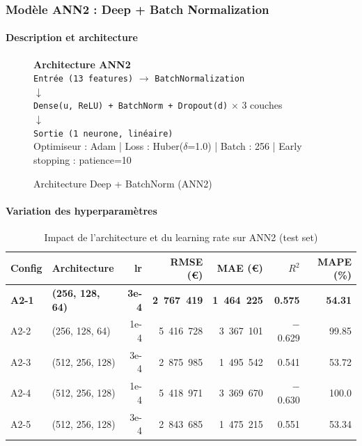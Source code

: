 \documentclass[12pt,a4paper]{article}
\begin{document}
\subsubsection{Modèle ANN2 : Deep + Batch Normalization}

\paragraph{Description et architecture}

\begin{figure}[H]
\centering
\begin{tcolorbox}[colback=lightgray,colframe=maincolor,width=0.85\textwidth,arc=2mm,boxrule=0.8pt]
\centering
\textbf{Architecture ANN2}\\[0.3cm]
\texttt{Entrée (13 features)} $\rightarrow$ \texttt{BatchNormalization}\\
$\downarrow$\\
\texttt{Dense(u, ReLU) + BatchNorm + Dropout(d)} $\times$ 3 couches\\
$\downarrow$\\
\texttt{Sortie (1 neurone, linéaire)}\\[0.2cm]
\small Optimiseur : Adam | Loss : Huber($\delta$=1.0) | Batch : 256 | Early stopping : patience=10
\end{tcolorbox}
\caption{Architecture Deep + BatchNorm (ANN2)}
\end{figure}



\paragraph{Variation des hyperparamètres}

\begin{table}[H]
\centering
\begin{tabular}{@{}llrrrrr@{}}
\toprule
\textbf{Config} & \textbf{Architecture} & \textbf{lr} &
\textbf{RMSE (€)} & \textbf{MAE (€)} & \textbf{$R^2$} & \textbf{MAPE (\%)} \\ \midrule
\textbf{A2-1} & \textbf{(256, 128, 64)} & \textbf{3e-4} &
\textbf{2~767~419} & \textbf{1~464~225} & \textbf{0.575} & \textbf{54.31} \\
A2-2 & (256, 128, 64)  & 1e-4 & 5~416~728 & 3~367~101 & $-$0.629 & 99.85  \\
A2-3 & (512, 256, 128) & 3e-4 & 2~875~985 & 1~495~542 & 0.541  & 53.72  \\
A2-4 & (512, 256, 128) & 1e-4 & 5~418~971 & 3~369~670 & $-$0.630 & 100.0  \\
A2-5 & (512, 256, 128) & 3e-4 & 2~843~685 & 1~475~215 & 0.551  & 53.34  \\ \midrule
\end{tabular}
\caption{Impact de l'architecture et du learning rate sur ANN2 (test set)}
\end{table}
\end{document}
